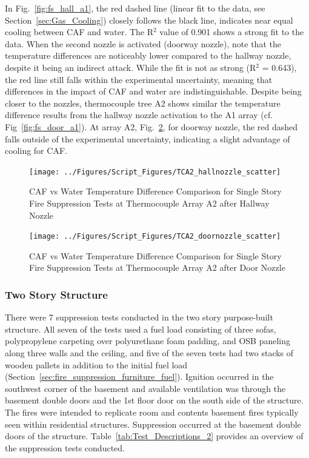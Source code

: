 \documentclass[12pt,oneside]{book}
\begin{document}
In Fig.~\ref{fig:fs_hall_a1}, the red dashed line (linear fit to the data, see Section~\ref{sec:Gas_Cooling}) closely follows the black line, indicates near equal cooling between CAF and water. The R$^2$ value of 0.901 shows a strong fit to the data. When the second nozzle is activated (doorway nozzle), note that the temperature differences are noticeably lower compared to the hallway nozzle, despite it being an indirect attack. While the fit is not as strong (R$^2$ = 0.643), the red line still falls within the experimental uncertainty, meaning that differences in the impact of CAF and water are indistinguishable. Despite being closer to the nozzles, thermocouple tree A2 shows similar the temperature difference results from the hallway nozzle activation to the A1 array (cf. Fig~\ref{fig:fs_door_a1}). At array A2, Fig.~\ref{fig:fs_door_a2}, for doorway nozzle, the red dashed falls outside of the experimental uncertainty, indicating a slight advantage of cooling for CAF.

\begin{figure}[!ht]
	\texttt{[image: ../Figures/Script\_Figures/TCA2\_hallnozzle\_scatter]}
	\caption{CAF vs Water Temperature Difference Comparison for Single Story Fire Suppression Tests at Thermocouple Array A2 after Hallway Nozzle}
	\label{fig:fs_hall_a2}
\end{figure}

\begin{figure}[!ht]
	\texttt{[image: ../Figures/Script\_Figures/TCA2\_doornozzle\_scatter]}
	\caption{CAF vs Water Temperature Difference Comparison for Single Story Fire Suppression Tests at Thermocouple Array A2 after Door Nozzle}
	\label{fig:fs_door_a2}
\end{figure}

\subsubsection*{Two Story Structure}
\label{sec:fire_supp_two}

There were 7 suppression tests conducted in the two story purpose-built structure. All seven of the tests used a fuel load consisting of three sofas, polypropylene carpeting over polyurethane foam padding, and OSB paneling along three walls and the ceiling, and five of the seven tests had two stacks of wooden pallets in addition to the initial fuel load (Section~\ref{sec:fire_suppression_furniture_fuel}). Ignition occurred in the southwest corner of the basement and available ventilation was through the basement double doors and the 1st floor door on the south side of the structure. The fires were intended to replicate room and contents basement fires typically seen within residential structures. Suppression occurred at the basement double doors of the structure. Table~\ref{tab:Test_Descriptions_2} provides an overview of the suppression tests conducted.
\end{document}
